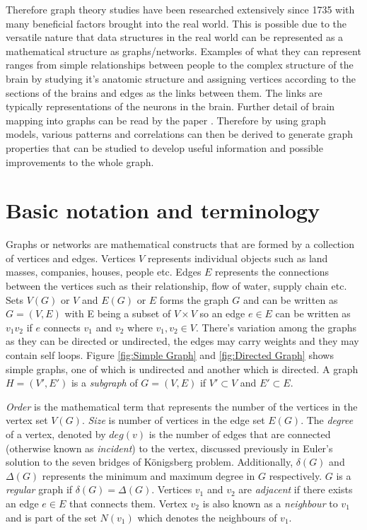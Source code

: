 Therefore graph theory studies have been researched extensively since 1735 with many beneficial factors brought into the real world. This is possible due to the versatile nature that data structures in the real world can be represented as a mathematical structure as graphs/networks. Examples of what they can represent ranges from simple relationships between people to the complex structure of the brain by studying it's anatomic structure and assigning vertices according to the sections of the brains and edges as the links between them. The links are typically representations of the neurons in the brain. Further detail of brain mapping into graphs can be read by the paper \cite{articlebrain}. Therefore by using graph models, various patterns and correlations can then be derived to generate graph properties that can be studied to develop useful information and possible improvements to the whole graph.

\section{Basic notation and terminology}
Graphs or networks are mathematical constructs that are formed by a collection of vertices and edges. Vertices $V$ represents individual objects such as land masses, companies, houses, people etc. Edges $E$ represents the connections between the vertices such as their relationship, flow of water, supply chain etc. Sets $V(G)$ or $V$ and $E(G)$ or $E$ forms the graph $G$ and can be written as $G=(V, E)$ with E being a subset of $V \times V$ so an edge $e \in E$ can be written as $v_{1}v_{2}$ if $e$ connects $v_{1}$ and $v_{2}$ where $v_{1}, v_{2} \in V$. There's variation among the graphs as they can be directed or undirected, the edges may carry weights and they may contain self loops. Figure \ref{fig:Simple Graph} and \ref{fig:Directed Graph} shows simple graphs, one of which is undirected and another which is directed. A graph $H = (V', E')$ is a \emph{subgraph} of $G=(V, E)$ if $V' \subset V$ and $E' \subset E$.

\emph{Order} is the mathematical term that represents the number of the vertices in the vertex set $V(G)$. \emph{Size} is number of vertices in the edge set $E(G)$. The \emph{degree} of a vertex, denoted by $deg(v)$ is the number of edges that are connected (otherwise known as \emph{incident}) to the vertex, discussed previously in Euler's solution to the seven bridges of Königsberg problem. Additionally, $\delta(G)$ and $\Delta(G)$ represents the minimum and maximum degree in $G$ respectively. $G$ is a \emph{regular} graph if $\delta(G) = \Delta(G)$. Vertices $v_{1}$ and $v_{2}$ are \emph{adjacent} if there exists an edge $e \in E$ that connects them. Vertex $v_{2}$ is also known as a \emph{neighbour} to $v_{1}$ and is part of the set $N(v_{1})$ which denotes the neighbours of $v_{1}$. 
\newline

